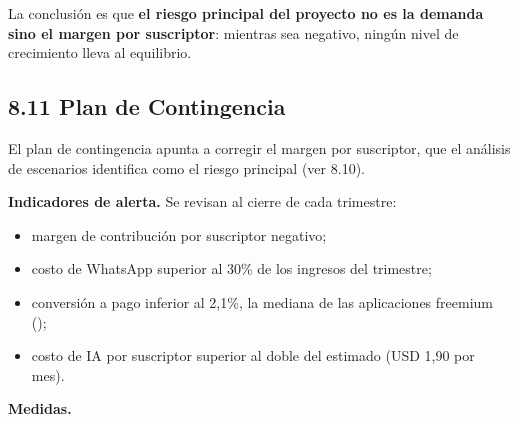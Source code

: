 La conclusión es que \textbf{el riesgo principal del proyecto no es la
demanda sino el margen por suscriptor}: mientras sea negativo, ningún
nivel de crecimiento lleva al equilibrio.

\subsection*{8.11 Plan de Contingencia}\label{plan-de-contingencia}

El plan de contingencia apunta a corregir el margen por suscriptor, que
el análisis de escenarios identifica como el riesgo principal (ver
8.10).

\textbf{Indicadores de alerta.} Se revisan al cierre de cada trimestre:

\begin{itemize}
\tightlist
\item
  margen de contribución por suscriptor negativo;
\item
  costo de WhatsApp superior al 30\% de los ingresos del trimestre;
\item
  conversión a pago inferior al 2,1\%, la mediana de las aplicaciones
  freemium ();
\item
  costo de IA por suscriptor superior al doble del estimado (USD 1,90
  por mes).
\end{itemize}

\textbf{Medidas.}

